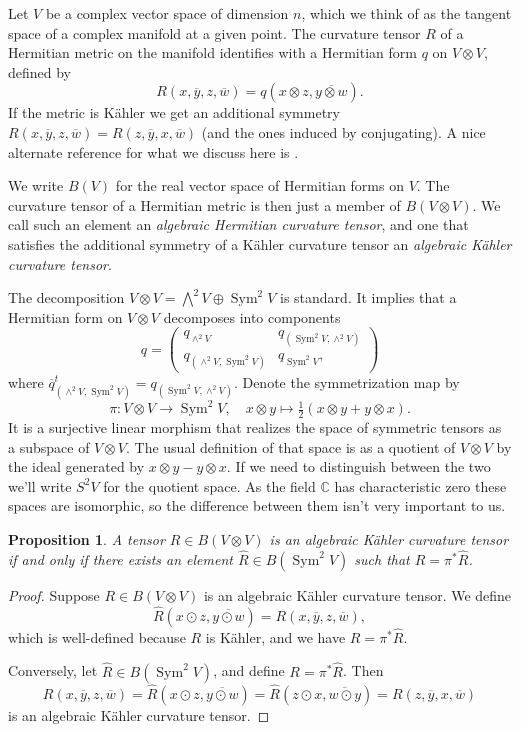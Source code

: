 \documentclass[10pt,a4paper]{amsart}
\newtheorem{prop}[theo]{Proposition}
\theoremstyle{definition}
\def\ov#1{\overline{#1}}
\newcommand{\kk}[1]{\mathbb{#1}}
\DeclareMathOperator{\Sym}{Sym}
\begin{document}
Let $V$ be a complex vector space of dimension $n$, which we think of as the
tangent space of a complex manifold at a given point.
The curvature tensor $R$ of a Hermitian metric on the manifold identifies with
a Hermitian form $q$ on $V \otimes V$, defined by
$$
R(x, \ov y, z, \ov w)
= q(x \otimes z, \ov{y \otimes w}).
$$
If the metric is K\"ahler we get an additional symmetry
$R(x, \ov y, z, \ov w) = R(z, \ov y, x, \ov w)$
(and the ones induced by conjugating).
A nice alternate reference for what we discuss here is
\cite{algebraic-kahler-curvature}.

We write $B(V)$ for the real vector space of Hermitian forms on $V$.
The curvature tensor of a Hermitian metric is then just a member of $B(V
\otimes V)$. We call such an element an \emph{algebraic Hermitian curvature
tensor}, and one that satisfies the additional symmetry of a K\"ahler curvature
tensor an \emph{algebraic K\"ahler curvature tensor}.

The decomposition $V \otimes V = \bigwedge^2 V \oplus \Sym^2 V$ is standard.
It implies that a Hermitian form on $V \otimes V$ decomposes into components
$$
q = \begin{pmatrix}
q_{\wedge^2 V} & q_{(\Sym^2V, \wedge^2 V)}
\\
q_{(\wedge^2 V, \Sym^2V)} & q_{\Sym^2 V},
\end{pmatrix}
$$
where $\ov{q}_{(\wedge^2 V, \Sym^2V)}^t = q_{(\Sym^2V, \wedge^2 V)}$.
Denote the symmetrization map by
$$
\pi : V \otimes V \to \Sym^2 V,
\quad
x \otimes y \mapsto \tfrac 12 (x \otimes y + y \otimes x).
$$
It is a surjective linear morphism that realizes the space of symmetric tensors
as a subspace of $V \otimes V$.
The usual definition of that space is as a quotient of $V \otimes V$ by the
ideal generated by $x \otimes y - y \otimes x$.
If we need to distinguish between the two we'll write $S^2V$ for the quotient
space.
As the field $\kk C$ has characteristic zero these spaces are isomorphic,
so the difference between them isn't very important to us.


\begin{prop}
A tensor $R \in B(V \otimes V)$ is an algebraic K\"ahler curvature tensor
if and only if there exists an element $\hat R \in B(\Sym^2 V)$ such that $R =
\pi^* \hat R$.
\end{prop}

\begin{proof}
Suppose $R \in B(V \otimes V)$ is an algebraic K\"ahler curvature tensor.
We define
$$
\hat R(x \odot z, \ov{y \odot w})
= R(x, \ov y, z, \ov w),
$$
which is well-defined because $R$ is K\"ahler, and we have $R = \pi^* \hat R$.

Conversely, let $\hat R \in B(\Sym^2 V)$, and define $R = \pi^* \hat R$.
Then
$$
R(x, \ov y, z, \ov w)
= \hat R(x \odot z, \ov{y \odot w})
= \hat R(z \odot x, \ov{w \odot y})
= R(z, \ov y, x, \ov w)
$$
is an algebraic K\"ahler curvature tensor.
\end{proof}
\end{document}
